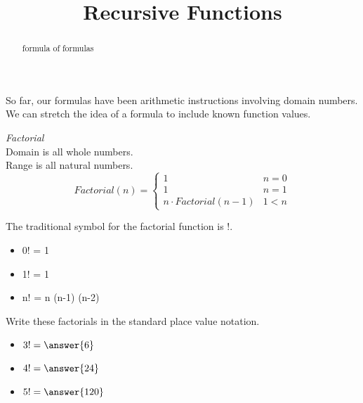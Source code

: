 \documentclass{ximera}
\title{Recursive Functions}
\begin{document}
\begin{abstract}
formula of formulas
\end{abstract}
\maketitle



So far, our formulas have been arithmetic instructions involving domain numbers.  We can stretch the idea of a formula to include known function values.









\begin{example}  \textit{Factorial} \\



Domain is all whole numbers. \\
Range is all natural numbers. \\




\[
Factorial(n) = 
\begin{cases}
  1 & n = 0 \\
  1 & n = 1 \\ 
  n \cdot Factorial(n-1) & 1 < n
\end{cases}
\]

The traditional symbol for the factorial function is !.


\begin{itemize}
  \item 0! = 1
  \item 1! = 1
  \item n! = n \cdot (n-1) \cdot (n-2)   
\end{itemize}





\begin{question} Write these factorials in the standard place value notation.


\begin{itemize}
\item $3! = \answer{6}$
\item $4! = \answer{24}$
\item $5! = \answer{120}$
\end{itemize}


\end{question}



\end{example}
\end{document}
